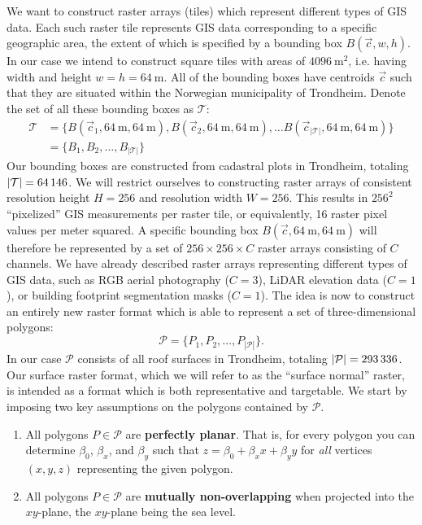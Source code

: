 We want to construct raster arrays (tiles) which represent different types of GIS data.
Each such raster tile represents GIS data corresponding to a specific geographic area, the extent of which is specified by a bounding box $B(\vec{c}, w, h)$.
In our case we intend to construct square tiles with areas of $\SI{4096}{\meter\squared}$, i.e. having width and height $w = h = \SI{64}{\meter}$.
All of the bounding boxes have centroids $\vec{c}$ such that they are situated within the Norwegian municipality of Trondheim.
Denote the set of all these bounding boxes as $\mathcal{T}$:
%
\begin{align*}
  \mathcal{T}
  &=
  \{
    B(\vec{c}_1, \SI{64}{\meter}, \SI{64}{\meter}),
    B(\vec{c}_2, \SI{64}{\meter}, \SI{64}{\meter}),
    \dots
    B(\vec{c}_{|\mathcal{T}|}, \SI{64}{\meter}, \SI{64}{\meter})
  \}
  \\
  &=
  \{
    B_1,
    B_2,
    \dots,
    B_{|\mathcal{T}|}
  \}
\end{align*}
%
Our bounding boxes are constructed from cadastral plots in Trondheim, totaling $|\mathcal{T}| = \num{64146}$.
We will restrict ourselves to constructing raster arrays of consistent resolution height $H = 256$ and resolution width $W = 256$.
This results in $256^2$ \enquote{pixelized} GIS measurements per raster tile, or equivalently, \num{16} raster pixel values per meter squared.
A specific bounding box $B(\vec{c}, \SI{64}{\meter}, \SI{64}{\meter})$ will therefore be represented by a set of $256 \times 256 \times C$ raster arrays consisting of $C$ channels.
We have already described raster arrays representing different types of GIS data, such as RGB aerial photography ($C = 3$), LiDAR elevation data ($C = 1$), or building footprint segmentation masks ($C = 1$).
The idea is now to construct an entirely new raster format which is able to represent a set of three-dimensional polygons:
\begin{equation*}
  \mathcal{P}
  =
  \{
    P_1,
    P_2,
    \dots,
    P_{|\mathcal{P}|}
  \}.
\end{equation*}
In our case $\mathcal{P}$ consists of all roof surfaces in Trondheim, totaling $|\mathcal{P}| = \num{293336}$.
Our surface raster format, which we will refer to as the \enquote{surface normal} raster, is intended as a format which is both representative and targetable.
We start by imposing two key assumptions on the polygons contained by $\mathcal{P}$.
\begin{enumerate}[label=\bfseries\sffamily A\arabic*, ref=A\arabic*]
  \item\label{itm:flat} All polygons $P \in \mathcal{P}$ are \textbf{perfectly planar}.
    That is, for every polygon you can determine $\beta_0$, $\beta_x$, and $\beta_y$ such that $z = \beta_0 + \beta_x x + \beta_y y$ for \emph{all} vertices $(x, y, z)$ representing the given polygon.
  \item\label{itm:non-overlapping} All polygons $P \in \mathcal{P}$ are \textbf{mutually non-overlapping} when projected into the $xy$-plane, the $xy$-plane being the sea level.
\end{enumerate}

